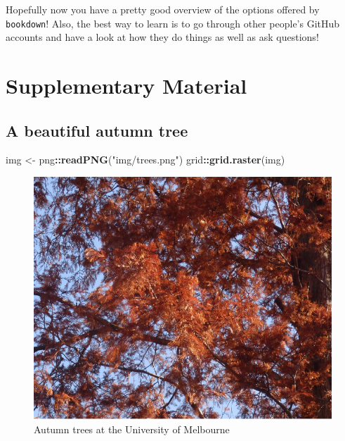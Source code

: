 \documentclass[12pt,]{article}
\newenvironment{Shaded}{\begin{snugshade}}{\end{snugshade}}
\newcommand{\KeywordTok}[1]{\textcolor[rgb]{0.13,0.29,0.53}{\textbf{#1}}}
\newcommand{\StringTok}[1]{\textcolor[rgb]{0.31,0.60,0.02}{#1}}
\newcommand{\OperatorTok}[1]{\textcolor[rgb]{0.81,0.36,0.00}{\textbf{#1}}}
\newcommand{\NormalTok}[1]{#1}
\begin{document}
Hopefully now you have a pretty good overview of the options offered by
\texttt{bookdown}! Also, the best way to learn is to go through other
people's GitHub accounts and have a look at how they do things as well
as ask questions!

\newpage

\section*{Supplementary Material}\label{supplementary-material}

\beginsupplement

\subsection*{A beautiful autumn tree}\label{a-beautiful-autumn-tree}

\begin{Shaded}
\begin{Highlighting}[]
\NormalTok{img <-}\StringTok{ }\NormalTok{png}\OperatorTok{::}\KeywordTok{readPNG}\NormalTok{(}\StringTok{"img/trees.png"}\NormalTok{)}
\NormalTok{grid}\OperatorTok{::}\KeywordTok{grid.raster}\NormalTok{(img)}
\end{Highlighting}
\end{Shaded}

\begin{figure}
\centering
\includegraphics{img/red-trees-1.pdf}
\caption{\label{fig:red-trees}Autumn trees at the University of Melbourne}
\end{figure}
\end{document}
